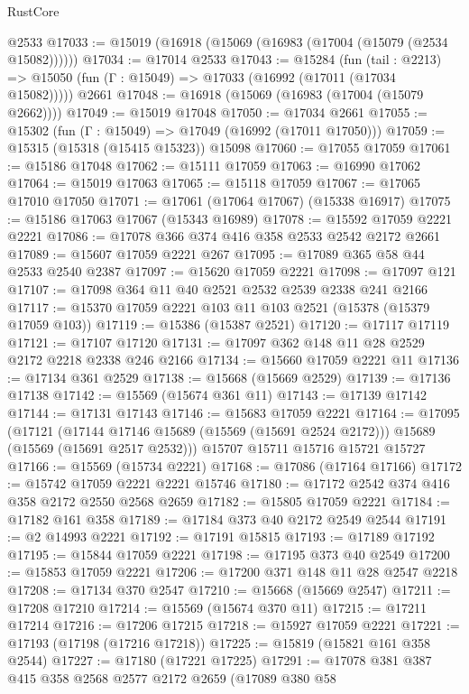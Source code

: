 \begin{lexlean}{RustCore}
\begin{coremodule}
    @2533
@17033 := @15019 (@16918 (@15069 (@16983 (@17004 (@15079 (@2534 @15082))))))
@17034 := @17014 @2533
@17043 := @15284
    (fun (tail : @2213) => @15050 (fun (Γ : @15049) => @17033 (@16992 (@17011 (@17034 @15082)))))
    @2661
@17048 := @16918 (@15069 (@16983 (@17004 (@15079 @2662))))
@17049 := @15019 @17048
@17050 := @17034 @2661
@17055 := @15302 (fun (Γ : @15049) => @17049 (@16992 (@17011 @17050)))
@17059 := @15315 (@15318 (@15415 @15323)) @15098
@17060 := @17055 @17059
@17061 := @15186 @17048
@17062 := @15111 @17059
@17063 := @16990 @17062
@17064 := @15019 @17063
@17065 := @15118 @17059
@17067 := @17065 @17010 @17050
@17071 := @17061 (@17064 @17067) (@15338 @16917)
@17075 := @15186 @17063 @17067 (@15343 @16989)
@17078 := @15592 @17059 @2221 @2221
@17086 := @17078 @366 @374 @416 @358 @2533 @2542 @2172 @2661
@17089 := @15607 @17059 @2221 @267
@17095 := @17089 @365 @58 @44 @2533 @2540 @2387
@17097 := @15620 @17059 @2221
@17098 := @17097 @121
@17107 := @17098 @364 @11 @40 @2521 @2532 @2539 @2338 @241 @2166
@17117 := @15370 @17059 @2221 @103 @11 @103 @2521 (@15378 (@15379 @17059 @103))
@17119 := @15386 (@15387 @2521)
@17120 := @17117 @17119
@17121 := @17107 @17120
@17131 := @17097 @362 @148 @11 @28 @2529 @2172 @2218 @2338 @246 @2166
@17134 := @15660 @17059 @2221 @11
@17136 := @17134 @361 @2529
@17138 := @15668 (@15669 @2529)
@17139 := @17136 @17138
@17142 := @15569 (@15674 @361 @11)
@17143 := @17139 @17142
@17144 := @17131 @17143
@17146 := @15683 @17059 @2221
@17164 := @17095
    (@17121
      (@17144 @17146 @15689 (@15569 (@15691 @2524 @2172)))
      @15689
      (@15569 (@15691 @2517 @2532)))
    @15707
    @15711
    @15716
    @15721
    @15727
@17166 := @15569 (@15734 @2221)
@17168 := @17086 (@17164 @17166)
@17172 := @15742 @17059 @2221 @2221 @15746
@17180 := @17172 @2542 @374 @416 @358 @2172 @2550 @2568 @2659
@17182 := @15805 @17059 @2221
@17184 := @17182 @161 @358
@17189 := @17184 @373 @40 @2172 @2549 @2544
@17191 := @2 @14993 @2221
@17192 := @17191 @15815
@17193 := @17189 @17192
@17195 := @15844 @17059 @2221
@17198 := @17195 @373 @40 @2549
@17200 := @15853 @17059 @2221
@17206 := @17200 @371 @148 @11 @28 @2547 @2218
@17208 := @17134 @370 @2547
@17210 := @15668 (@15669 @2547)
@17211 := @17208 @17210
@17214 := @15569 (@15674 @370 @11)
@17215 := @17211 @17214
@17216 := @17206 @17215
@17218 := @15927 @17059 @2221
@17221 := @17193 (@17198 (@17216 @17218))
@17225 := @15819 (@15821 @161 @358 @2544)
@17227 := @17180 (@17221 @17225)
@17291 := @17078
    @381
    @387
    @415
    @358
    @2568
    @2577
    @2172
    @2659
    (@17089
      @380
      @58

\end{coremodule}
\end{lexlean}
